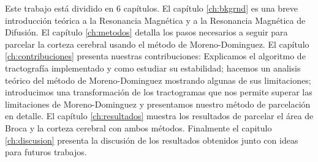 Este trabajo est\'a dividido en 6 cap\'itulos. El cap\'itulo 
\ref{ch:bkgrnd} es una breve introducci\'on te\'orica a la Resonancia 
Magn\'etica y a la Resonancia Magn\'etica de Difusi\'on. El cap\'itulo
\ref{ch:metodos} detalla los pasos necesarios a seguir para parcelar la
corteza cerebral usando el m\'etodo de Moreno-Dominguez. El cap\'itulo
\ref{ch:contribuciones} presenta nuestras contribuciones: Explicamos el
algoritmo de tractograf\'ia implementado y como estudiar su estabilidad;
hacemos un analisis te\'orico del m\'etodo de Moreno-Dominguez 
mostrando algunas de sus limitaciones; introducimos una transformaci\'on 
de los tractogramas que nos permite superar las limitaciones de 
Moreno-Dominguez y presentamos nuestro m\'etodo de parcelaci\'on en
detalle. El cap\'itulo \ref{ch:resultados} muestra los resultados de
parcelar el \'area de Broca y la corteza cerebral con ambos m\'etodos.
Finalmente el capitulo \ref{ch:discusion} presenta la discusi\'on de los
resultados obtenidos junto con ideas para futuros trabajos.







